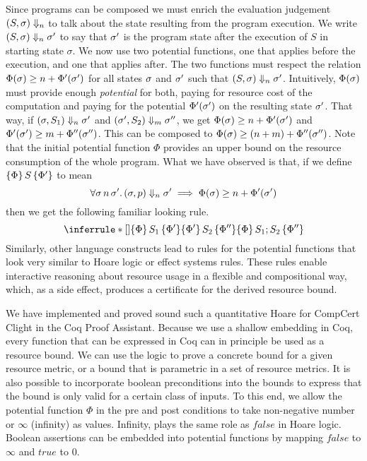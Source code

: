 \documentclass[nocopyrightspace,preprint]{sigplanconf}
\begin{document}
Since programs can be composed we must enrich the evaluation judgement
$(S, \sigma) \Downarrow_{n}$ to talk about the state resulting from
the program execution.  We write $(S, \sigma) \Downarrow_n \sigma'$ to
say that $\sigma'$ is the program state after the execution of $S$ in
starting state $\sigma$.  We now use two potential functions, one that
applies before the execution, and one that applies after.  The two
functions must respect the relation $\Phi(\sigma) \ge n +
\Phi'(\sigma')$ for all states $\sigma$ and $\sigma'$ such that $(S,
\sigma) \Downarrow_n \sigma'$.  Intuitively, $\Phi(\sigma)$ must
provide enough \emph{potential} for both, paying for resource cost of
the computation and paying for the potential $\Phi'(\sigma')$ on the
resulting state $\sigma'$. That way, if $(\sigma, S_1) \Downarrow_n
\sigma'$ and $(\sigma', S_2) \Downarrow_m \sigma''$, we get
$\Phi(\sigma) \ge n + \Phi'(\sigma')$ and $\Phi'(\sigma') \ge m +
\Phi''(\sigma'')$.  This can be composed to $\Phi(\sigma) \ge (n + m)
+ \Phi''(\sigma'')$.  Note that the initial potential function $\Phi$
provides an upper bound on the resource consumption of the whole
program.  What we have observed is that, if we define $\{\Phi\}\, S\, \{\Phi'\}$ to mean
$$
\forall \sigma\, n\, \sigma'.\, (\sigma, p) \Downarrow_n \sigma' \implies \Phi(\sigma) \ge
n + \Phi'(\sigma')
$$
then we get the following familiar looking rule.
$$
\RuleNolabel
{\htriple{\Phi}{S_1}{\Phi'} \\ \htriple{\Phi'}{S_2}{\Phi''}}
{\htriple{\Phi} {S_1; S_2}  {\Phi''}}
$$
%
Similarly, other language constructs lead to rules for the potential
functions that look very similar to Hoare logic or effect systems
rules.  These rules enable interactive reasoning about resource usage
in a flexible and compositional way, which, as a side effect, produces
a certificate for the derived resource bound.

We have implemented and proved sound such a quantitative Hoare for
CompCert Clight in the Coq Proof Assistant.  Because we use a shallow
embedding in Coq, every function that can be expressed in Coq can in
principle be used as a resource bound.  We can use the logic to prove
a concrete bound for a given resource metric, or a bound that is
parametric in a set of resource metrics.  It is also possible to
incorporate boolean preconditions into the bounds to express that the
bound is only valid for a certain class of inputs.  To this end, we
allow the potential function $\Phi$ in the pre and post conditions to
take non-negative number or $\infty$ (infinity) as values.  Infinity,
plays the same role as $\mathit{false}$ in Hoare logic.  Boolean assertions can
be embedded into potential functions by mapping $\mathit{false}$ to $\infty$ and
$\mathit{true}$ to $0$.
\end{document}

